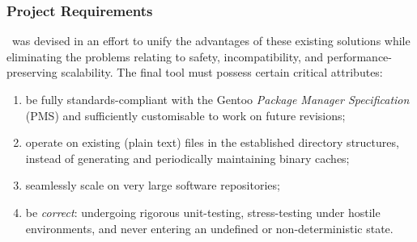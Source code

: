 \documentclass{beamer}
\numberwithin{figure}{section}
\newcommand\programname{%
    \texorpdfstring{\raisebox{.5pt}{\ttfamily owd-euses}}{'owd-euses'}}
\begin{document}
\begin{frame}
    \frametitle{Project Requirements}
    \programname\ was devised in an effort to unify the advantages of these
    existing solutions while eliminating the problems relating to safety,
    incompatibility, and performance-preserving scalability. The final tool must
    possess certain critical attributes:
    \pause

    \begin{enumerate}
        \item be fully standards-compliant with the Gentoo \emph{Package Manager
            Specification} (PMS) and sufficiently customisable to work on future
            revisions;
        \item operate on existing (plain text) files in the established
            directory structures, instead of generating and periodically
            maintaining binary caches;
        \item seamlessly scale on very large software repositories;
        \item be \emph{correct}: undergoing rigorous unit-testing,
            stress-testing under hostile environments, and never entering an
            undefined or non-deterministic state.
    \end{enumerate}
\end{frame}
\end{document}
